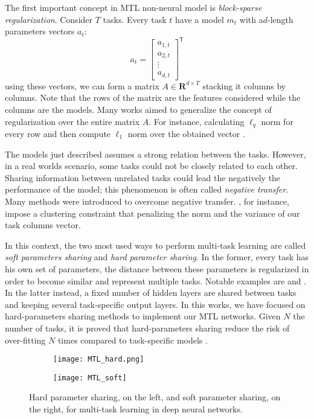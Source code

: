 The first important concept in MTL non-neural model is \emph{block-sparse regularization}. Consider $T$ tasks. Every task $t$ have a model $m_t$ with  a$d$-length parameters vectors $a_t$: 
\begin{equation}
a_t = \begin{bmatrix}
           a_{1, t} \\
           a_{2, t} \\
           \vdots \\
           a_{d, t}
         \end{bmatrix}^\mathsf{T}
\end{equation}
using these vectors, we can form a matrix $A \in \mathbf{R}^{d \times T}$ stacking it columns by columns. Note that the rows of the matrix are the features considered while the columns are the models. Many works aimed to generalize the concept of regularization over the entire matrix $A$. For instance, calculating $\ell_q$ norm for every row and then compute $\ell_1$ norm over the obtained vector \cite{Ruder2017, Zhang2008, ArgyriouPontil2008, YuanLin2006}.  

The models just described assumes a strong relation between the tasks. However, in a real worlds scenario, some tasks could not be closely related to each other. Sharing information between unrelated tasks could lead the negatively the performance of the model; this phenomenon is often called \emph{negative transfer}. 
Many methods were introduced to overcome negative transfer. \cite{Evgeniou2005}, for instance, impose a clustering constraint that penalizing the norm and the variance of our task columns vector.

In this context, the two
most used ways to perform multi-task learning are called \emph{soft
parameters sharing} and \emph{hard parameter sharing}. In the former,
every task has his own set of parameters, the distance between these
parameters is regularized in order to become similar and represent
multiple tasks. Notable examples are \cite{duong-etal-2015-low} and
\cite{yang2016trace}. In the latter instead, a fixed number of hidden
layers are shared between tasks and keeping several task-specific output
layers. In this works, we have focused on hard-parameters sharing methods
to implement our MTL networks. Given $N$ the number of tasks, it is proved
that hard-parameters sharing reduce the risk of over-fitting $N$ times
compared to task-specific models \cite{baxter1997}.
\begin{figure}
\centering
\begin{subfigure}{.5\textwidth}
  \centering
  \texttt{[image: MTL\_hard.png]}
  \label{fig:sub1}
\end{subfigure}%
\begin{subfigure}{.5\textwidth}
  \centering
  \texttt{[image: MTL\_soft]}
  \label{fig:sub2}
\end{subfigure}
\caption{Hard parameter sharing, on the left, and soft parameter sharing, on the right, for multi-task learning in deep neural networks.}
\label{fig:test}
\end{figure}

